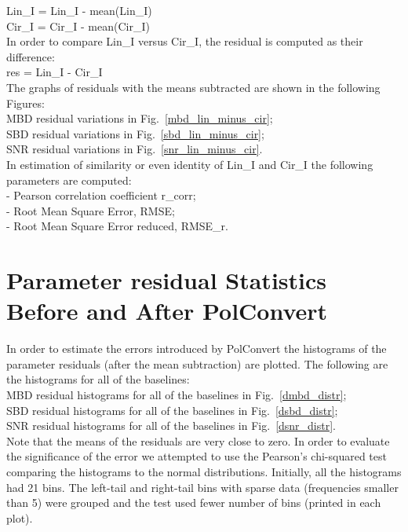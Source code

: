 \documentclass[letterpaper,twoside,12pt]{article}
\begin{document}
\indent Lin\_I = Lin\_I - mean(Lin\_I) \\
\indent Cir\_I = Cir\_I - mean(Cir\_I) \\

\noindent In order to compare Lin\_I versus Cir\_I, the residual is computed as their difference: \\

\indent res = Lin\_I - Cir\_I \\

\noindent The graphs of residuals with the means subtracted are shown in the following Figures: \\

\indent MBD residual variations in Fig.~\ref{mbd_lin_minus_cir};  \\
\indent SBD residual variations in Fig.~\ref{sbd_lin_minus_cir};  \\
\indent SNR residual variations in Fig.~\ref{snr_lin_minus_cir}.  \\

In estimation of similarity or even identity of Lin\_I and Cir\_I the following parameters are computed: \\

\noindent - Pearson correlation coefficient r\_corr; \\
\noindent - Root Mean Square Error, RMSE; \\
\noindent - Root Mean Square Error reduced, RMSE\_r. \\


\section{Parameter residual Statistics Before and After PolConvert}

In order to estimate the errors introduced by PolConvert the histograms of the parameter residuals (after the mean subtraction) are plotted. The following are the histograms for all of the baselines: \\

\indent MBD residual histograms for all of the baselines in Fig.~\ref{dmbd_distr};  \\
\indent SBD residual histograms for all of the baselines in Fig.~\ref{dsbd_distr};  \\
\indent SNR residual histograms for all of the baselines in Fig.~\ref{dsnr_distr}.  \\

Note that the means of the residuals are very close to zero. In order to evaluate the significance of the error we attempted to use the Pearson's chi-squared test comparing the histograms to the normal distributions. Initially, all the histograms had 21 bins. The left-tail and right-tail bins with sparse data (frequencies smaller than 5) were grouped and the test used fewer number of bins (printed in each plot). 
\end{document}
